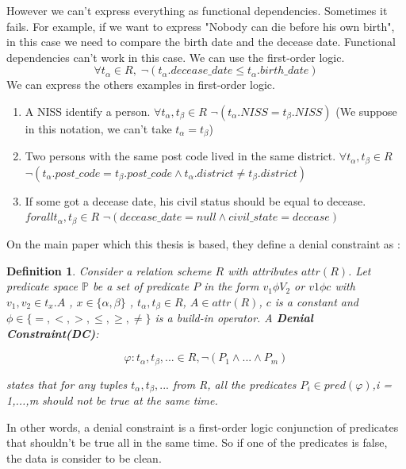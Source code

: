 \documentclass[letterpaper, 12pt]{report}
\newtheorem{mydef}{Definition}
\begin{document}
However we can't express everything as functional dependencies. Sometimes it fails. For example, if we want to express "Nobody can die before his own birth", in this case we need to compare the birth date and the decease date. Functional dependencies can't work in this case. We can use the first-order logic. 
$$\forall t_\alpha \in R, \; \neg(t_\alpha.decease\_date \leq t_\alpha.birth\_date)$$ We can express the others examples in first-order logic.

\begin{enumerate}
\item A NISS identify a person. $\forall t_\alpha,t_\beta \in R$ $\neg(t_\alpha.NISS = t_\beta.NISS)$ (We suppose in this notation, we can't take $t_\alpha = t_\beta$)
\item Two persons with the same post code lived in the same district. $\forall t_\alpha,t_\beta \in R$ $\neg(t_\alpha.post\_code = t_\beta.post\_code \wedge t_\alpha.district \neq t_\beta.district) $
\item If some got a decease date, his civil status should be equal to decease. $forall t_\alpha,t_\beta \in R$ $\neg(decease\_date = null \wedge civil\_state = decease)$
\end{enumerate}

On the main paper which this thesis is based, they define a denial constraint as \cite{main}:

\begin{mydef}
Consider a relation scheme $R$ with attributes $attr(R)$. Let predicate space $\mathbb{P}$ be a set of predicate  $P$ in the form  $v_1 \phi V_2$ or $v1 \phi c$ with $v_1,v_2 \in t_x.A$ , $x \in \{\alpha,\beta\}$ , $t_\alpha,t_\beta \in R$, $A \in attr(R)$, $c$ is a constant and $\phi \in \{ =,<,>,\leq, \geq, \neq \}$ is a build-in operator.  A \textbf{Denial Constraint(DC)}:

$$\varphi : t_\alpha,t_\beta,... \in R, \neg(P_1 \wedge ... \wedge P_m)$$

states that for any tuples $t_\alpha,t_\beta,...$ from R, all the predicates $P_i \in pred(\varphi)$,i = 1,...,m should not be true at the same time.
\end{mydef}

In other words, a denial constraint is a first-order logic conjunction of predicates that shouldn't be true all in the same time. So if one of the predicates is false, the data is consider to be clean. 
\end{document}
